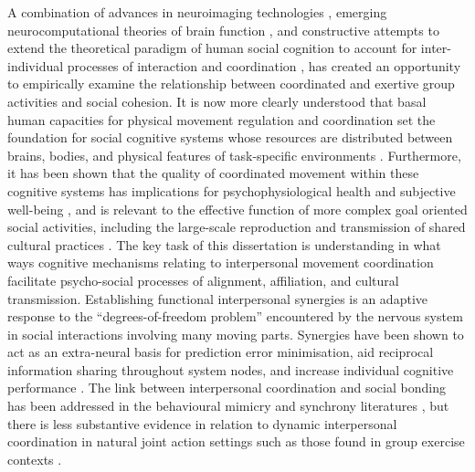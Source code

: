 A combination of advances in neuroimaging technologies \citep{Frith2007}, emerging neurocomputational theories of brain function \citep{Friston2010,Frith2010,Clark2013}, and constructive attempts to extend the theoretical paradigm of human social cognition to account for inter-individual processes of interaction and coordination \citep{Sebanz2006,Dale2014}, has created an opportunity to empirically examine the relationship between coordinated and exertive group activities and social cohesion.  It is now more clearly understood that basal human capacities for physical movement regulation and coordination set the foundation for social cognitive systems whose resources are distributed between brains, bodies, and physical features of task-specific environments \citep{Hutchins2000,Kirsh2006,Semin2008,Semin2012,Coey2012}.  Furthermore, it has been shown that the quality of coordinated movement within these cognitive systems has implications for psychophysiological health and subjective well-being \citep{Wheatley2012}, and is relevant to the effective function of more complex goal oriented social activities, including the large-scale reproduction and transmission of shared cultural practices \citep{Dunbar2012,Roepstorff2010,Claidiere2014,Launay2016}.
The key task of this dissertation is understanding in what ways cognitive mechanisms relating to interpersonal movement coordination facilitate psycho-social processes of alignment, affiliation, and cultural transmission\citep{Marsh2009}.  Establishing functional interpersonal synergies is an adaptive response to the ``degrees-of-freedom problem'' encountered by the nervous system in social interactions involving many moving parts.  Synergies have been shown to act as an extra-neural basis for prediction error minimisation, aid reciprocal information sharing throughout system nodes, and increase individual cognitive performance \citep{Schmidt2016}.  The link between interpersonal coordination and social bonding has been addressed in the behavioural mimicry and synchrony literatures \citep[e.g.,][]{Wheatley2012,Launay2016,Mogan2017}, but there is less substantive evidence in relation to dynamic interpersonal coordination in natural joint action settings such as those found in group exercise contexts \citep{Marsh2009,Miles2009,Lumsden2012}.

